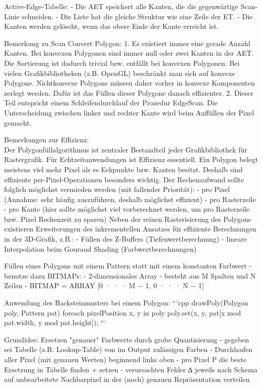 \documentclass[10pt,landscape]{article}
\begin{document}
\begin{multicols}{3}
Active-Edge-Tabelle:
- Die AET speichert alle Kanten, die die gegenwärtige Scan-Linie schneiden.
- Die Liste hat die gleiche Struktur wie eine Zeile der ET.
- Die Kanten werden gelöscht, wenn das obere Ende der Kante erreicht ist.

Bemerkung zu Scan Convert Polygon:
1. Es existiert immer eine gerade Anzahl Kanten. Bei konvexen Polygonen sind immer null oder zwei Kanten in der AET. Die Sortierung ist dadurch trivial bzw. entfällt bei konvexen Polygonen. Bei vielen Grafikbibliotheken (z.B. OpenGL) beschränkt man sich auf konvexe Polygone. Nichtkonvexe Polygone müssen daher vorher in konvexe Komponenten zerlegt werden. Dafür ist das Füllen dieser Polygone danach effizienter.
2. Dieser Teil entspricht einem Schleifendurchlauf der Prozedur EdgeScan. Die Unterscheidung zwischen linker und rechter Kante wird beim Auffüllen der Pixel gemacht.

Bemerkungen zur Effizienz:\\
Der Polygonfüllalgorithmus ist zentraler Bestandteil jeder Grafikbibliothek für Rastergrafik. Für Echtzeitanwendungen ist Effizienz essentiell. Ein Polygon belegt
meistens viel mehr Pixel als es Eckpunkte bzw. Kanten besitzt. Deshalb sind effiziente per-Pixel-Operationen besonders wichtig. Der Rechenaufwand sollte folglich möglichst vermieden werden (mit fallender Priorität):
- pro Pixel (Annahme: sehr häufig auszuführen, deshalb möglichst effizient)
- pro Rasterzeile
- pro Kante (hier sollte möglichst viel vorberechnet werden, um pro Rasterzeile bzw. Pixel Rechenzeit zu sparen)
Neben der reinen Rasterisierung des Polygons existieren Erweiterungen des inkrementellen Ansatzes für effiziente Berechnungen in der 3D-Grafik, z.B.:
- Füllen des Z-Buffers (Tiefenwertberechnung)
- lineare Interpolation beim Gouraud Shading (Farbwertberechnungen)

Füllen eines Polygons mit einem Pattern statt mit einem konstanten Farbwert
- benutze dazu BITMAPs:
  - 2-dimensionales Array
  - besteht aus M Spalten und N Zeilen
  - BITMAP = ARRAY [0 · · · M − 1, 0 · · · N − 1]

Anwendung des Backsteinmusters bei einem Polygon:
```cpp
drawPoly(Polygon poly, Pattern pat){
  foreach pixelPosition x, y in poly
    poly.set(x, y, pat[x mod pat.width, y mod pat.height]);
}
```

Grundidee: Ersetzen "genauer" Farbwerte durch grobe Quantisierung
- gegeben sei Tabelle (z.B. Lookup-Table) von im Output zulässigen Farben
- Durchlaufen aller Pixel (mit genauen Werten) beginnend links oben
- pro Pixel P die beste Ersetzung in Tabelle finden + setzen
- verursachten Fehler ∆ jeweils nach Schema auf unbearbeitete Nachbarpixel in der (noch) genauen Repräsentation verteilen


\end{multicols}
\end{document}
